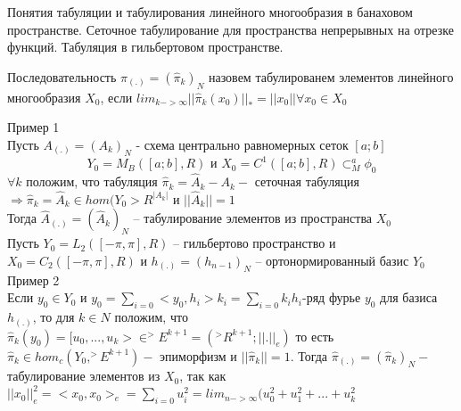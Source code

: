\documentclass[__main__.tex]{subfiles}
\begin{document}
 Понятия табуляции и табулирования линейного многообразия в банаховом
пространстве. Сеточное табулирование для пространства непрерывных на отрезке
функций. Табуляция в гильбертовом пространстве.\\

\begin{definition}
Последовательность $\hat{\pi}_{(.)}=(\hat{\pi}_k)_N$ назовем табулированем элементов линейного многообразия $X_0$, если $lim_{k->\infty}||\hat{\pi}_k(x_0)||_*=||x_0|| \forall x_0\in X_0$ 
\end{definition}

Пример 1\\
Пусть $A_{(.)}=(A_k)_N$ - схема центрально равномерных сеток $[a;b]$\\
$$Y_0=M_B([a;b],R)\text{ и } X_0=C^1([a;b],R)\subset_M^a \phi_0$$
$\forall k$ положим, что табуляция $\hat{\pi}_k=\hat{A}_k-A_k -$ сеточная табуляция $\Rightarrow \hat{\pi}_k=\hat{A}_k \in hom (Y_0>R^{|A_k|}$ и  $||\hat{A}_k||=1$\\
Тогда $\hat{A}_{(.)}=(\hat{A}_k)_N$ --  табулирование элементов из пространства $X_0$\\
Пусть $Y_0=L_2([-\pi,\pi],R)$ -- гильбертово пространство и $X_0=C_2([-\pi,\pi],R)$ и $h_{(.)}=(h_{n-1})_N$ -- ортонормированный базис $Y_0$\\

Пример 2\\
Если $y_0\in Y_0 $ и  $y_0=\sum_{i=0}<y_0,h_i>k_i=\sum_{i=0}k_ih_i$-ряд фурье $y_0$ для базиса $h_{(.)}$, то для $k\in N$ положим, что $\hat{\pi}_k(y_0)=[u_0,...,u_k>\in ^>E^{k+1}=(^>R^{k+1};||.||_e) $ то есть $\hat{\pi}_k\in hom_c (Y_0,^>E^{k+1})-$ эпиморфизм и $||\hat{\pi}_k||=1.$ Тогда $\hat{\pi}_{(.)}=(\hat{\pi}_k)_N -$ табулирование элементов из $X_0$, так как $||x_0||^2_e=<x_0,x_0>_e=\sum_{i=0}u_i^2=lim_{n->\infty}(u_0^2+u_1^2+...+u_k^2$
\end{document}
